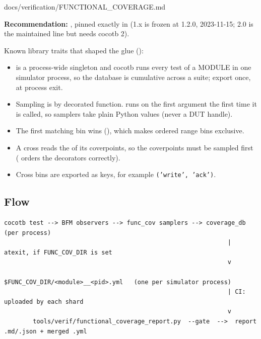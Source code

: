 \begin{relocated}{docs/verification/FUNCTIONAL_COVERAGE.md}
{}

\textbf{Recommendation: }, pinned exactly
in  (1.x is frozen at 1.2.0, 2023-11-15; 2.0 is
the maintained line but needs cocotb 2).

Known library traits that shaped the glue
():

\begin{itemize}
\tightlist
\item
   is a process-wide singleton and cocotb runs every
  test of a MODULE in one simulator process, so the database is
  cumulative across a suite; export once, at process exit.
\item
  Sampling is by decorated function.  runs
   on the first argument the first time it is
  called, so samplers take plain Python values (never a DUT handle).
\item
  The first matching bin wins (), which makes ordered range
  bins exclusive.
\item
  A cross reads the  of its coverpoints, so the
  coverpoints must be sampled first ( orders the
  decorators correctly).
\item
  Cross bins are exported as  keys, for example
  \texttt{('write',\allowbreak{}\ 'ack')}.
\end{itemize}

\subsection{Flow}\label{tm:flow:functional-coverage:2-flow}

\begin{lstlisting}[language={}]
 cocotb test --> BFM observers --> func_cov samplers --> coverage_db (per process)
                                                              | atexit, if FUNC_COV_DIR is set
                                                              v
                                       $FUNC_COV_DIR/<module>__<pid>.yml   (one per simulator process)
                                                              | CI: uploaded by each shard
                                                              v
        tools/verif/functional_coverage_report.py  --gate  -->  report .md/.json + merged .yml
\end{lstlisting}


\end{relocated}
